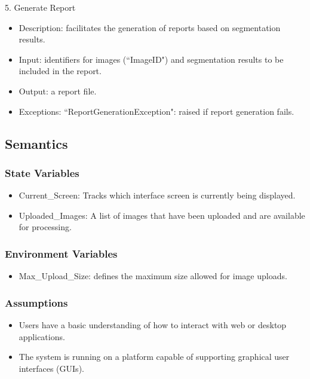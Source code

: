 \documentclass[12pt, titlepage]{article}
\begin{document}
5. Generate Report
\begin{itemize}
    \item Description: facilitates the generation of reports based on segmentation results.
    \item Input: identifiers for images (``ImageID") and segmentation results to be included in the report.
    \item Output: a report file.
    \item Exceptions: ``ReportGenerationException": raised if report generation fails.
\end{itemize}

\subsection{Semantics}

\subsubsection{State Variables}
\begin{itemize}
    \item Current\_Screen: Tracks which interface screen is currently being displayed.
    \item Uploaded\_Images: A list of images that have been uploaded and are available for processing.
\end{itemize}

\subsubsection{Environment Variables}

\begin{itemize}
    \item Max\_Upload\_Size: defines the maximum size allowed for image uploads.
\end{itemize}

\subsubsection{Assumptions}
\begin{itemize}
    \item Users have a basic understanding of how to interact with web or desktop applications.
    \item The system is running on a platform capable of supporting graphical user interfaces (GUIs).
\end{itemize}
\end{document}
